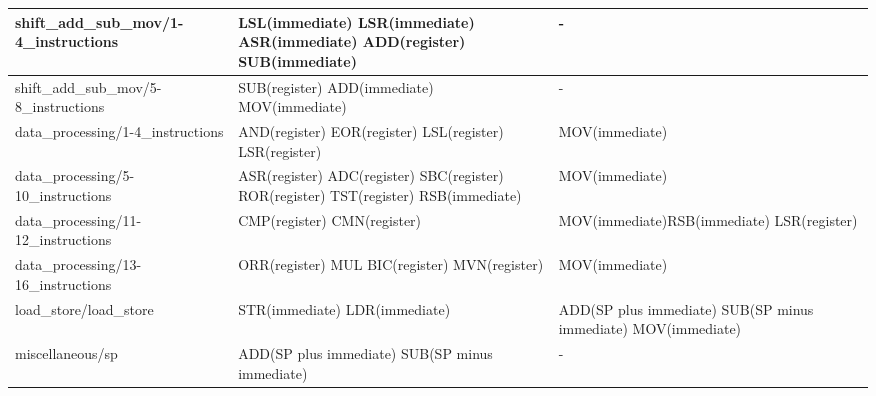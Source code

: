 \documentclass{article}
\begin{document}
\begin{tabularx}{\textwidth}{|l|X|X|}
        shift{\_}add{\_}sub{\_}mov/1-4{\_}instructions  & LSL(immediate) \newline LSR(immediate) \newline ASR(immediate) \newline ADD(register) \newline SUB(immediate) & -\\
        \hline
        shift{\_}add{\_}sub{\_}mov/5-8{\_}instructions & SUB(register) \newline ADD(immediate) \newline MOV(immediate) & -\\
        \hline
        data{\_}processing/1-4{\_}instructions         & AND(register) \newline EOR(register) \newline LSL(register) \newline LSR(register) & MOV(immediate)\\
        \hline
        data{\_}processing/5-10{\_}instructions        & ASR(register) \newline ADC(register) \newline SBC(register) \newline ROR(register) \newline TST(register) \newline RSB(immediate) & MOV(immediate)\\
        \hline
        data{\_}processing/11-12{\_}instructions       & CMP(register) \newline CMN(register)  & MOV(immediate)\newline RSB(immediate) \newline LSR(register)\\
        \hline
        data{\_}processing/13-16{\_}instructions       & ORR(register) \newline MUL \newline BIC(register) \newline MVN(register) & MOV(immediate)\\
        \hline
        load{\_}store/load{\_}store                     & STR(immediate) \newline LDR(immediate)                                                                                            & ADD(SP plus immediate) \newline SUB(SP minus immediate) \newline MOV(immediate)      \\
        \hline
        miscellaneous/sp                                & ADD(SP plus immediate) \newline SUB(SP minus immediate)                                                                           & -                                                                                    \\

\end{tabularx}
\end{document}
